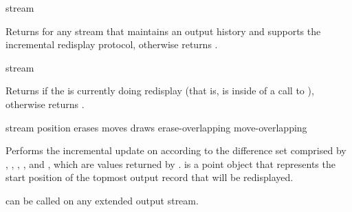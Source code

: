  {stream}

Returns  for any stream that maintains an output history and supports
the incremental redisplay protocol, otherwise returns .

 {stream}

Returns  if the  is currently doing redisplay (that is,
is inside of a call to ), otherwise returns .

 {stream position
                                     erases moves draws erase-overlapping move-overlapping} 

Performs the incremental update on  according to the difference set
comprised by , , , ,
and , which are values returned by
.   is a point object that represents
the start position of the topmost output record that will be redisplayed.

 can be called on any extended output stream.
